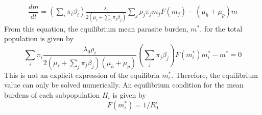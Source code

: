 \documentclass[12pt,a4paper]{article}
\theoremstyle{plain}%
\theoremstyle{definition}
\theoremstyle{remark}
\begin{document}
\begin{equation}
	\begin{split}
		\dfrac{dm}{dt}= \left( \sum_i \pi_i \beta_{i} \right)  
		\frac{ \lambda_0}{2 (\mu_{\ell}+\sum_j \pi_j \beta_j  )}  
		\sum_j \rho_{j} \pi_{j} m_{j} F(m_{j})   -(\mu_{h}+\mu_p) m%
	\end{split}
\end{equation}
From this equation, the equilibrium mean parasite burden, $m^*$, for the total population is given by
\begin{equation}
	\sum_i \pi_i \frac{ \lambda_0 \rho_{i}}{2 (\mu_{\ell}+\sum_j \pi_j \beta_j  )(\mu_{h}+\mu_p)} 
	\left( \sum_j \pi_{j} \beta_{j} \right) F( m^*_{i}) m^*_{i} - m^*=0 
\end{equation}
This is not an explicit expression of the equilibria $m_{i}^*$. Therefore, the equilibrium value can only be solved numerically.
An equilibrium condition for the mean burdens of each subpopulation $H_{i}$ is given by
\begin{equation}%
	F(m^*_{i})=1/R_0^{i}
\end{equation}
%	
\end{document}
